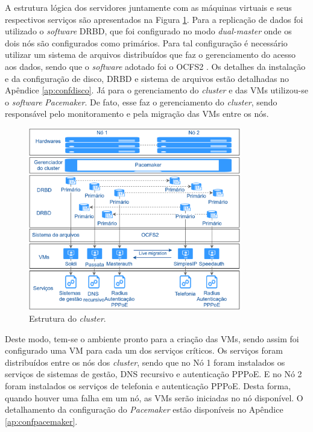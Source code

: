 A estrutura lógica dos servidores juntamente com as máquinas virtuais e seus respectivos serviços são apresentados na Figura 
\ref{fig:projeto_estrutura}. Para a replicação de dados foi utilizado o \textit{software} \ac{DRBD}, que foi configurado no modo 
\textit{dual-master} onde os dois nós são configurados como primários. Para tal configuração é necessário utilizar um sistema de arquivos 
distribuídos que faz o gerenciamento do acesso aos dados, sendo que o \textit{software} adotado foi o \ac{OCFS2} \cite{ocfs2}. 
Os detalhes da instalação e da configuração de disco, \ac{DRBD} e sistema de arquivos estão detalhadas no Apêndice \ref{ap:confdisco}. 
Já para o gerenciamento do \textit{cluster} e das \acp{VM} utilizou-se o \textit{software} \textit{Pacemaker}. De fato, esse faz o gerenciamento do
\textit{cluster}, sendo responsável pelo monitoramento e pela migração das \acp{VM} entre os nós.

\begin{figure}[h!]
 \centering
 \includegraphics[width=350px]{img/projeto_estrutura.eps}
 \caption{Estrutura do \textit{cluster}.}
 \label{fig:projeto_estrutura}
\end{figure}


Deste modo, tem-se o ambiente pronto para a criação das \acp{VM}, sendo assim foi configurado uma \ac{VM} para cada um dos serviços críticos.
Os serviços foram distribuídos entre os nós dos \textit{cluster}, sendo que no Nó 1 foram instalados os serviços de sistemas de gestão, 
\ac{DNS} recursivo e autenticação \ac{PPPoE}. E no Nó 2 foram instalados os serviços de telefonia e autenticação \ac{PPPoE}.
Desta forma, quando houver uma falha em um nó, as \acp{VM} serão iniciadas no nó disponível. O detalhamento da configuração do \textit{Pacemaker} 
estão disponíveis no Apêndice \ref{ap:confpacemaker}.


